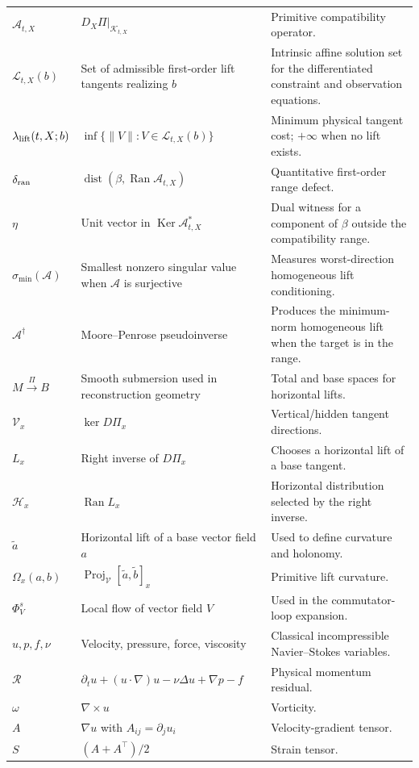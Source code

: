 \documentclass[12pt]{article}
\newcommand{\Rres}{\mathcal R}
\newcommand{\Ran}{\operatorname{Ran}}
\newcommand{\Ker}{\operatorname{Ker}}
\newcommand{\Proj}{\operatorname{Proj}}
\newcommand{\dist}{\operatorname{dist}}
\newcommand{\Hh}{\mathcal H}
\newcommand{\Kt}{\mathcal K}
\newcommand{\Vv}{\mathcal V}
\newcommand{\Comp}{\mathscr A}
\begin{document}
\begin{longtable}{p{}p{}p{}}
$\Comp_{t,X}$ & $D_X\Pi|_{\Kt_{t,X}}$ & Primitive compatibility operator. \\
$\mathscr L_{t,X}(b)$ & Set of admissible first-order lift tangents realizing $b$ & Intrinsic affine solution set for the differentiated constraint and observation equations. \\
$\lambda_{\rm lift}(t,X;b)$ & $\inf\{\|V\|:V\in\mathscr L_{t,X}(b)\}$ & Minimum physical tangent cost; $+\infty$ when no lift exists. \\
$\delta_{\rm ran}$ & $\dist(\beta,\Ran\Comp_{t,X})$ & Quantitative first-order range defect. \\
$\eta$ & Unit vector in $\Ker\Comp_{t,X}^*$ & Dual witness for a component of $\beta$ outside the compatibility range. \\
$\sigma_{\min}(\Comp)$ & Smallest nonzero singular value when $\Comp$ is surjective & Measures worst-direction homogeneous lift conditioning. \\
$\Comp^\dagger$ & Moore--Penrose pseudoinverse & Produces the minimum-norm homogeneous lift when the target is in the range. \\
$M\xrightarrow{\Pi}B$ & Smooth submersion used in reconstruction geometry & Total and base spaces for horizontal lifts. \\
$\Vv_x$ & $\ker D\Pi_x$ & Vertical/hidden tangent directions. \\
$L_x$ & Right inverse of $D\Pi_x$ & Chooses a horizontal lift of a base tangent. \\
$\Hh_x$ & $\Ran L_x$ & Horizontal distribution selected by the right inverse. \\
$\widetilde a$ & Horizontal lift of a base vector field $a$ & Used to define curvature and holonomy. \\
$\Omega_x(a,b)$ & $\Proj_{\Vv}[\widetilde a,\widetilde b]_x$ & Primitive lift curvature. \\
$\Phi_V^s$ & Local flow of vector field $V$ & Used in the commutator-loop expansion. \\
$u,p,f,\nu$ & Velocity, pressure, force, viscosity & Classical incompressible Navier--Stokes variables. \\
$\Rres$ & $\partial_tu+(u\cdot\nabla)u-\nu\Delta u+\nabla p-f$ & Physical momentum residual. \\
$\omega$ & $\nabla\times u$ & Vorticity. \\
$A$ & $\nabla u$ with $A_{ij}=\partial_j u_i$ & Velocity-gradient tensor. \\
$S$ & $(A+A^\top)/2$ & Strain tensor. \\

\end{longtable}
\end{document}
